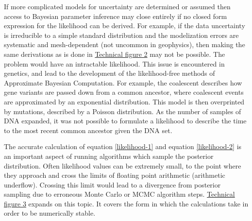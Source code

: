If more complicated models for uncertainty are determined or assumed then access to Bayesian parameter inference may close entirely if no closed form expression for the likelihood can be derived. For example, if the data uncertainty is irreducible to a simple standard distribution and the modelization errors are systematic and mesh-dependent (not uncommon in geophysics), then making the same derivations as is done in \hyperref[tf1]{Technical figure 2} may not be possible. The problem would have an intractable likelihood. This issue is encountered in genetics, and lead to the development of the likelihood-free methods of Approximate Bayesian Computation. For example, the coalescent \citep{Marjoram2006} describes how gene variants are passed down from a common ancestor, where coalescent events are approximated by an exponential distribution. This model is then overprinted by mutations, described by a Poisson distribution. As the number of samples of DNA expanded, it was not possible to formulate a likelihood to describe the time to the most recent common ancestor given the DNA set.\par

The accurate calculation of equation \ref{likelihood-1} and equation \ref{likelihood-2} is an important aspect of running algorithms which sample the posterior distribution. Often likelihood values can be extremely small, to the point where they approach and cross the limits of floating point arithmetic (arithmetic underflow). Crossing this limit would lead to a divergence from posterior sampling due to erroneous Monte Carlo or MCMC algorithm steps. \hyperref[tf3]{Technical figure 3} expands on this topic. It covers the form in which the calculations take in order to be numerically stable.\par

\newpage


